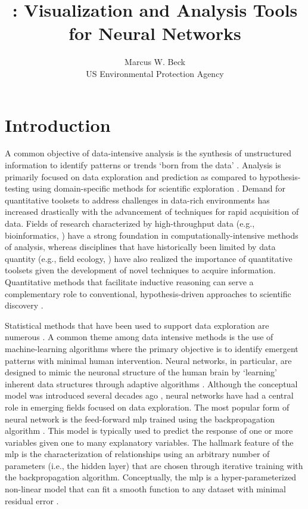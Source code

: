 \documentclass[article,shortnames]{jss}
\author{Marcus W. Beck\\US Environmental Protection Agency}
\title{\pkg{NeuralNetTools}: Visualization and Analysis Tools for Neural Networks}
\begin{document}

\section[Introduction]{Introduction}

A common objective of data-intensive analysis is the synthesis of unstructured information to identify patterns or trends `born from the data' \citep{Bell09,Kelling09,Michener12}.  Analysis is primarily focused on data exploration and prediction as compared to hypothesis-testing using domain-specific methods for scientific exploration \citep{Kell03}.  Demand for quantitative toolsets to address challenges in data-rich environments has increased drastically with the advancement of techniques for rapid acquisition of data. Fields of research characterized by high-throughput data (e.g., bioinformatics, \citet{Saeys07}) have a strong foundation in computationally-intensive methods of analysis, whereas disciplines that have historically been limited by data quantity (e.g., field ecology, \citet{Swanson15}) have also realized the importance of quantitative toolsets given the development of novel techniques to acquire information.  Quantitative methods that facilitate inductive reasoning can serve a complementary role to conventional, hypothesis-driven approaches to scientific discovery \citep{Kell03}.  

Statistical methods that have been used to support data exploration are numerous \citep{Jain00,Recknagel06,Zuur10}.  A common theme among data intensive methods is the use of machine-learning algorithms where the primary objective is to identify emergent patterns with minimal human intervention.  Neural networks, in particular, are designed to mimic the neuronal structure of the human brain by `learning' inherent data structures through adaptive algorithms \citep{Rumelhart86,Ripley96}.  Although the conceptual model was introduced several decades ago \citep{McCulloch43}, neural networks have had a central role in emerging fields focused on data exploration.  The most popular form of neural network is the feed-forward \ac{mlp} trained using the backpropagation algorithm \citep{Rumelhart86}.  This model is typically used to predict the response of one or more variables given one to many explanatory variables.  The hallmark feature of the \ac{mlp} is the characterization of relationships using an arbitrary number of parameters (i.e., the hidden layer) that are chosen through iterative training with the backpropagation algorithm.  Conceptually, the \ac{mlp} is a hyper-parameterized non-linear model that can fit a smooth function to any dataset with minimal residual error \citep{Hornik91}.
\end{document}
